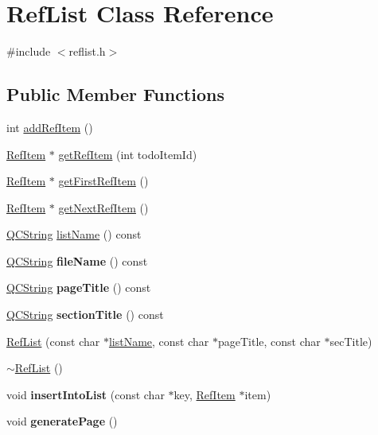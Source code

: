\hypertarget{class_ref_list}{}\section{Ref\+List Class Reference}
\label{class_ref_list}


{\ttfamily \#include $<$reflist.\+h$>$}

\subsection*{Public Member Functions}
\begin{DoxyCompactItemize}
\item 
int \mbox{\hyperlink{class_ref_list_ae3dccd8cef3a09ed34c6fb611766875b}{add\+Ref\+Item}} ()
\item 
\mbox{\hyperlink{struct_ref_item}{Ref\+Item}} $\ast$ \mbox{\hyperlink{class_ref_list_af047154431d78b27f413e14cadc1d15e}{get\+Ref\+Item}} (int todo\+Item\+Id)
\item 
\mbox{\hyperlink{struct_ref_item}{Ref\+Item}} $\ast$ \mbox{\hyperlink{class_ref_list_a065a043b7798849b1b97734b39ff3e85}{get\+First\+Ref\+Item}} ()
\item 
\mbox{\hyperlink{struct_ref_item}{Ref\+Item}} $\ast$ \mbox{\hyperlink{class_ref_list_a29659cc06bbde1e0b3a2b968ae333927}{get\+Next\+Ref\+Item}} ()
\item 
\mbox{\hyperlink{class_q_c_string}{Q\+C\+String}} \mbox{\hyperlink{class_ref_list_a7e731cccf3c01e3b8c04c1955e8e0a5e}{list\+Name}} () const
\item 
\mbox{\label{class_ref_list_ae0bc0a1bdcf5f3a4018a09bc79b6dbb3}} 
\mbox{\hyperlink{class_q_c_string}{Q\+C\+String}} {\bfseries file\+Name} () const
\item 
\mbox{\label{class_ref_list_a3ed329a8c21b43e174a88a9152fea631}} 
\mbox{\hyperlink{class_q_c_string}{Q\+C\+String}} {\bfseries page\+Title} () const
\item 
\mbox{\label{class_ref_list_a68687120cabce4bc5e4f2e7ceb37c95d}} 
\mbox{\hyperlink{class_q_c_string}{Q\+C\+String}} {\bfseries section\+Title} () const
\item 
\mbox{\hyperlink{class_ref_list_a53383174c5d9adbffbfaf6b7680b5d34}{Ref\+List}} (const char $\ast$\mbox{\hyperlink{class_ref_list_a7e731cccf3c01e3b8c04c1955e8e0a5e}{list\+Name}}, const char $\ast$page\+Title, const char $\ast$sec\+Title)
\item 
\mbox{\hyperlink{class_ref_list_a24ed19af8e396ebb4c196ab7a6805901}{$\sim$\+Ref\+List}} ()
\item 
\mbox{\label{class_ref_list_ab6dc34e95c0e8c36a07fe57de27fc6dd}} 
void {\bfseries insert\+Into\+List} (const char $\ast$key, \mbox{\hyperlink{struct_ref_item}{Ref\+Item}} $\ast$item)
\item 
\mbox{\label{class_ref_list_a1fb6f991a5826241faab676ba08fb5e3}} 
void {\bfseries generate\+Page} ()
\end{DoxyCompactItemize}


